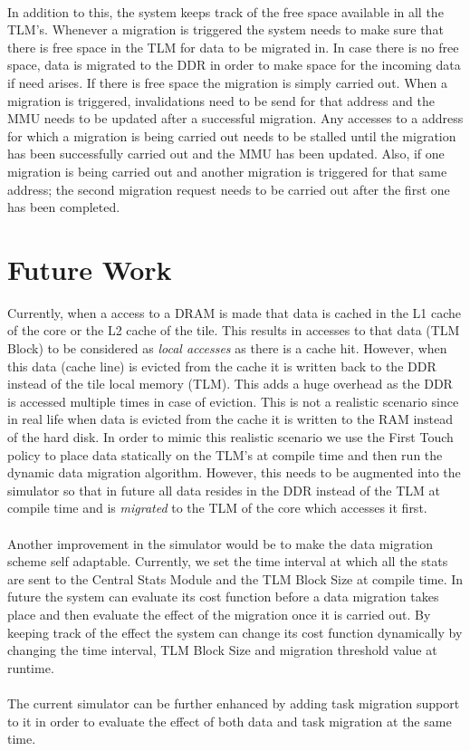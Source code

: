 \documentclass{listhesis}
\begin{document}
\\
In addition to this, the system keeps track of the free space available in all the TLM's. Whenever a migration is triggered the system needs to make sure that there is free space in the TLM for data to be migrated in. In case there is no free space, data is migrated to the DDR in order to make space for the incoming data if need arises. If there is free space the migration is simply carried out. When a migration is triggered, invalidations need to be send for that address and the MMU needs to be updated after a successful migration. Any accesses to a address for which a migration is being carried out needs to be stalled until the migration has been successfully carried out and the MMU has been updated. Also, if one migration is being carried out and another migration is triggered for that same address; the second migration request needs to be carried out after the first one has been completed. \\
\section{Future Work}
Currently, when a access to a DRAM is made that data is cached in the L1 cache of the core or the L2 cache of the tile. This results in accesses to that data (TLM Block) to be considered as \textit{local accesses} as there is a cache hit. However, when this data (cache line) is evicted from the cache it is written back to the DDR instead of the tile local memory (TLM). This adds a huge overhead as the DDR is accessed multiple times in case of eviction. This is not a realistic scenario since in real life when data is evicted from the cache it is written to the RAM instead of the hard disk. In order to mimic this realistic scenario we use the First Touch policy to place data statically on the TLM's at compile time and then run the dynamic data migration algorithm. However, this needs to be augmented into the simulator so that in future all data resides in the DDR instead of the TLM at compile time and is \textit{migrated} to the TLM of the core which accesses it first.\\
\\
Another improvement in the simulator would be to make the data migration scheme self adaptable. Currently, we set the time interval at which all the stats are sent to the Central Stats Module and the TLM Block Size at compile time. In future the system can evaluate its cost function before a data migration takes place and then evaluate the effect of the migration once it is carried out. By keeping track of the effect the system can change its cost function dynamically by changing the time interval, TLM Block Size and migration threshold value at runtime.\\
\\
The current simulator can be further enhanced by adding task migration support to it in order to evaluate the effect of both data and task migration at the same time.
\cleardoublepage



\confirmation
\end{document}
